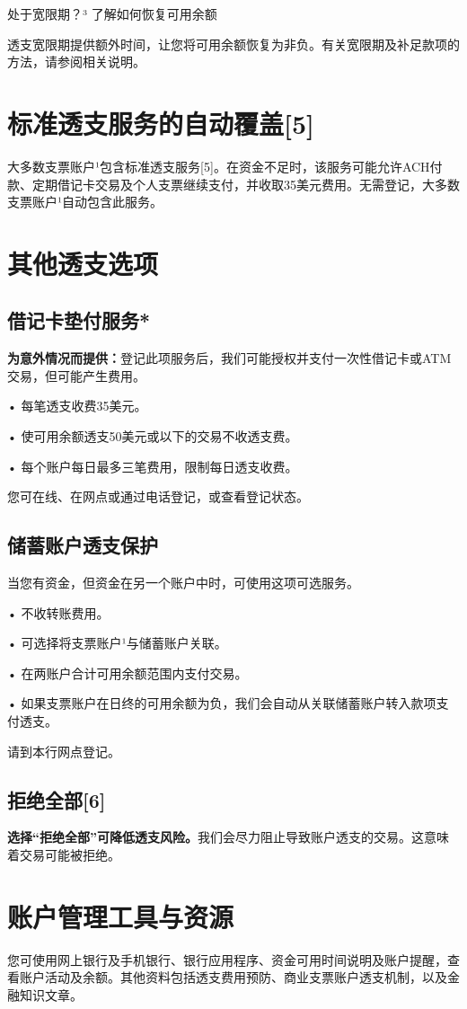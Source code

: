 \documentclass[UTF8,fontset=none,11pt,a4paper]{ctexart}
\begin{document}
处于宽限期？³ 了解如何恢复可用余额


透支宽限期提供额外时间，让您将可用余额恢复为非负。有关宽限期及补足款项的方法，请参阅相关说明。


\section*{标准透支服务的自动覆盖[5]}
大多数支票账户¹包含标准透支服务[5]。在资金不足时，该服务可能允许ACH付款、定期借记卡交易及个人支票继续支付，并收取35美元费用。无需登记，大多数支票账户¹自动包含此服务。


\section*{其他透支选项}
\subsection*{借记卡垫付服务*}
\textbf{为意外情况而提供：}登记此项服务后，我们可能授权并支付一次性借记卡或ATM交易，但可能产生费用。


• 每笔透支收费35美元。


• 使可用余额透支50美元或以下的交易不收透支费。


• 每个账户每日最多三笔费用，限制每日透支收费。


您可在线、在网点或通过电话登记，或查看登记状态。


\subsection*{储蓄账户透支保护}
当您有资金，但资金在另一个账户中时，可使用这项可选服务。


• 不收转账费用。


• 可选择将支票账户¹与储蓄账户关联。


• 在两账户合计可用余额范围内支付交易。


• 如果支票账户在日终的可用余额为负，我们会自动从关联储蓄账户转入款项支付透支。


请到本行网点登记。


\subsection*{拒绝全部[6]}
\textbf{选择“拒绝全部”可降低透支风险。}我们会尽力阻止导致账户透支的交易。这意味着交易可能被拒绝。


\section*{账户管理工具与资源}
您可使用网上银行及手机银行、银行应用程序、资金可用时间说明及账户提醒，查看账户活动及余额。其他资料包括透支费用预防、商业支票账户透支机制，以及金融知识文章。
\end{document}
